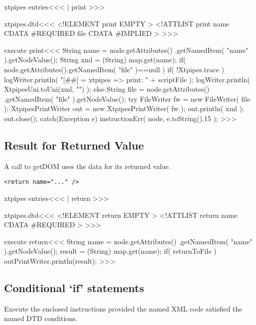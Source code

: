 \documentclass{article}
\begin{document}
{\<xtpipes entries\><<<
| print
>>>


\<xtpipes.dtd\><<<
<!ELEMENT print EMPTY >
<!ATTLIST print
          name CDATA #REQUIRED
          file CDATA #IMPLIED
>
>>>



\<execute print\><<<
String name = node.getAttributes()
                 .getNamedItem( "name" ).getNodeValue();
String xml = (String) map.get(name);
if( node.getAttributes().getNamedItem( "file" )==null ){
   if( !Xtpipes.trace ){
      logWriter.println( "[##]  = xtpipes => print: " + scriptFile );
   }
   logWriter.println( XtpipesUni.toUni(xml, "") );
} else {
   String file = node.getAttributes()
                 .getNamedItem( "file" ).getNodeValue();
   try{
       FileWriter fw = new FileWriter( file );
       XtpipesPrintWriter out = new XtpipesPrintWriter( fw );
       out.println( xml );
       out.close();
   } catch(Exception e){
       instructionErr( node, e.toString(),15 );
}  }
>>>




\subsection{Result for Returned Value}

A call to getDOM uses the data for its returned value.

\begin{verbatim}
<return name="..." />
\end{verbatim}



\<xtpipes entries\><<<
| return
>>>


\<xtpipes.dtd\><<<
<!ELEMENT return EMPTY >
<!ATTLIST return
          name CDATA #REQUIRED
>
>>>



\<execute return\><<<
String name = node.getAttributes()
                 .getNamedItem( "name" ).getNodeValue();
result = (String) map.get(name);
if( returnToFile ){
   outPrintWriter.println(result);
}
>>>




\subsection{Conditional `if' statements}

Execute the enclosed instructions provided the named XML code
satisfied the named DTD conditions.

}
\end{document}
